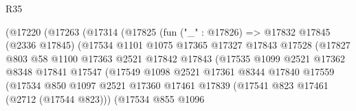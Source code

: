 \begin{lexlean}{R35}
\begin{coremodule}
                                (@17220
                                  (@17263
                                    (@17314
                                      (@17825
                                        (fun ("_" : @17826) =>
                                        @17832
                                          @17845
                                          (@2336 @17845)
                                          (@17534
                                            @1101
                                            @1075
                                            @17365
                                            @17327
                                            @17843
                                            @17528
                                            (@17827
                                              @803
                                              @58
                                              @1100
                                              @17363
                                              @2521
                                              @17842
                                              @17843
                                              (@17535
                                                @1099
                                                @2521
                                                @17362
                                                @8348
                                                @17841
                                                @17547
                                                (@17549
                                                  @1098
                                                  @2521
                                                  @17361
                                                  @8344
                                                  @17840
                                                  @17559
                                                  (@17534
                                                    @850
                                                    @1097
                                                    @2521
                                                    @17360
                                                    @17461
                                                    @17839
                                                    (@17541 @823 @17461 (@2712 (@17544 @823)))
                                                    (@17534
                                                      @855
                                                      @1096

\end{coremodule}
\end{lexlean}
